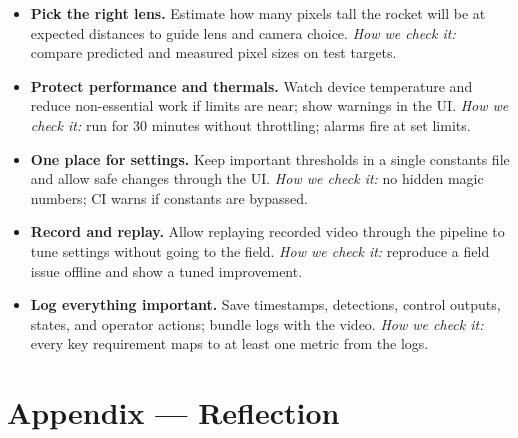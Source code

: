 \documentclass[12pt]{article}
\begin{document}
\begin{itemize}
  \item \textbf{Pick the right lens.}
        Estimate how many pixels tall the rocket will be at expected distances to guide lens and camera choice.
        \emph{How we check it:} compare predicted and measured pixel sizes on test targets.

  \item \textbf{Protect performance and thermals.}
        Watch device temperature and reduce non-essential work if limits are near; show warnings in the UI.
        \emph{How we check it:} run for 30 minutes without throttling; alarms fire at set limits.

  \item \textbf{One place for settings.}
        Keep important thresholds in a single constants file and allow safe changes through the UI.
        \emph{How we check it:} no hidden magic numbers; CI warns if constants are bypassed.

  \item \textbf{Record and replay.}
        Allow replaying recorded video through the pipeline to tune settings without going to the field.
        \emph{How we check it:} reproduce a field issue offline and show a tuned improvement.

  \item \textbf{Log everything important.}
        Save timestamps, detections, control outputs, states, and operator actions; bundle logs with the video.
        \emph{How we check it:} every key requirement maps to at least one metric from the logs.
\end{itemize}

\newpage{}
\section*{Appendix --- Reflection}
\end{document}
